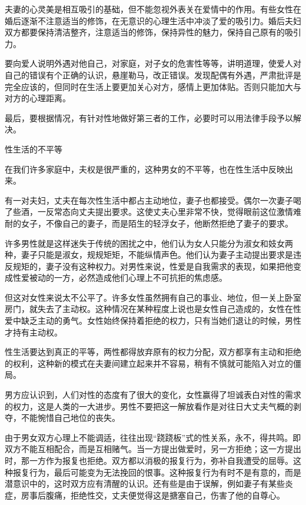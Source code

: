 \documentclass[12pt,UTF8]{ctexbook}
\begin{document}
夫妻的心灵美是相互吸引的基础，但不能忽视外表关在爱情中的作用。有些女性在婚后逐渐不注意适当的修饰，在无意识的心理生活中冲淡了爱的吸引力。婚后夫妇双方都要保持清洁整齐，注意适当的修饰，保持异性的魅力，保持自己原有的吸引力。

要向爱人说明外遇对他自己，对家庭，对子女的危害性等等，讲明道理，使爱人对自己的错误有个正确的认识，悬崖勒马，改正错误。发现配偶有外遇，严肃批评是完全应该的，但同时在生活上要更加关心对方，感情上更加体贴。否则只能加大与对方的心理距离。

最后，要根据情况，有针对性地做好第三者的工作，必要时可以用法律手段予以解决。





性生活的不平等


在我们许多家庭中，夫权是很严重的，这种男女的不平等，也在性生活中反映出来。

有一对夫妇，丈夫在每次性生活中都占主动地位，妻子也都接受。偶尔一次妻子喝了些酒，一反常态向丈夫提出要求。这使丈夫心里非常不快，觉得眼前这位激情难耐的女子，不像自己的妻子，而是陌生的轻浮女子，他断然拒绝了妻子的要求。

许多男性就是这样迷失于传统的困扰之中，他们认为女人只能分为淑女和妓女两种，妻子只能是淑女，规规矩矩，不能纵情声色。他们认为妻子主动提出要求是违反规矩的，妻子没有这种权力。对男性来说，性爱是自我需求的表现，如果把他变成性爱被动的一方，必然造成他们心理上不可抗拒的焦虑感。

但这对女性来说太不公平了。许多女性虽然拥有自己的事业、地位，但一关上卧室房门，就失去了主动权。这种情况在某种程度上说也是女性自己造成的，女性在性爱中缺乏主动的勇气。女性始终保持着拒绝的权力，只有当她们退让的时候，男性才持有主动权。

性生活要达到真正的平等，两性都得放弃原有的权力分配，双方都享有主动和拒绝的权利，这种新的模式在夫妻间建立起来并不容易，稍有不慎就可能陷入对立的僵局。

男方应认识到，人们对性的态度有了很大的变化，女性赢得了坦诚表白对性的需求的权力，这是人类的一大进步。男性不要把这一解放看作是对往日大丈夫气概的剥夺，不能惋惜自己地位的丧失。

由于男女双方心理上不能调适，往往出现“跷跷板”式的性关系，永不，得共鸣。即双方不能互相配合，而是互相赌气。当一方提出做爱时，另一方拒绝；这一方提出时，那一方作为报复也拒绝。双方都以消极的报复行为，弥补自我遭受的屈辱。这种报复行为，最后可能变为无法挽回的恨事。这种报复行为有时不是有意的，而是潜意识中的，这时双方应有清醒的认识。还有些是由于误解，例如妻子有某些炎症，房事后腹痛，拒绝性交，丈夫便觉得这是搪塞自己，伤害了他的自尊心。
\end{document}
